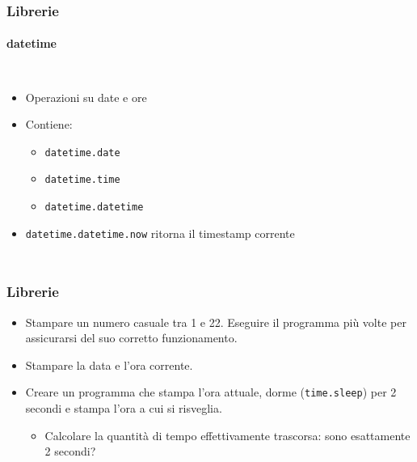 \begin{contentframe}
    \frametitle{Librerie}
    \framesubtitle{datetime}

    \begin{columns}
        \begin{itemize}
            \item Operazioni su date e ore
            \bigskip
            \item Contiene:
            \begin{itemize}
                \item \texttt{datetime.date}
                \item \texttt{datetime.time}
                \item \texttt{datetime.datetime}
            \end{itemize}
            \bigskip
            \item \texttt{datetime.datetime.now} ritorna il timestamp corrente 
        \end{itemize}
        
        \centering
    \end{columns}
\end{contentframe}

\begin{exerciseframe}
    \frametitle{Librerie}

    \begin{itemize}
        \item Stampare un numero casuale tra 1 e 22. Eseguire il programma più volte per assicurarsi del suo corretto funzionamento.

        \pause
        \bigskip
        \item Stampare la data e l'ora corrente.

        \pause
        \bigskip
        \item Creare un programma che stampa l'ora attuale, dorme (\texttt{time.sleep}) per 2 secondi e stampa l'ora a cui si risveglia.
        \pause
        \begin{itemize}
            \item Calcolare la quantità di tempo effettivamente trascorsa: sono esattamente 2 secondi?
        \end{itemize}
        
    \end{itemize}
\end{exerciseframe}
